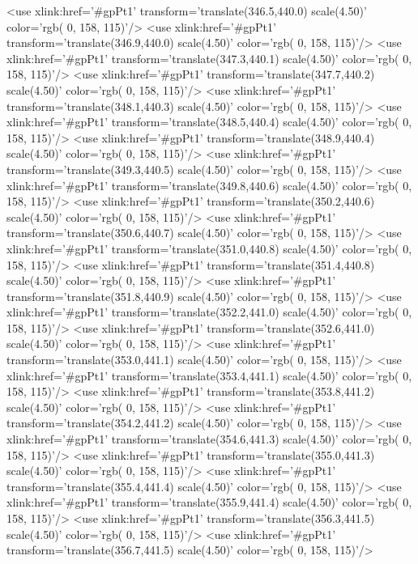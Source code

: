 	<use xlink:href='#gpPt1' transform='translate(346.5,440.0) scale(4.50)' color='rgb(  0, 158, 115)'/>
	<use xlink:href='#gpPt1' transform='translate(346.9,440.0) scale(4.50)' color='rgb(  0, 158, 115)'/>
	<use xlink:href='#gpPt1' transform='translate(347.3,440.1) scale(4.50)' color='rgb(  0, 158, 115)'/>
	<use xlink:href='#gpPt1' transform='translate(347.7,440.2) scale(4.50)' color='rgb(  0, 158, 115)'/>
	<use xlink:href='#gpPt1' transform='translate(348.1,440.3) scale(4.50)' color='rgb(  0, 158, 115)'/>
	<use xlink:href='#gpPt1' transform='translate(348.5,440.4) scale(4.50)' color='rgb(  0, 158, 115)'/>
	<use xlink:href='#gpPt1' transform='translate(348.9,440.4) scale(4.50)' color='rgb(  0, 158, 115)'/>
	<use xlink:href='#gpPt1' transform='translate(349.3,440.5) scale(4.50)' color='rgb(  0, 158, 115)'/>
	<use xlink:href='#gpPt1' transform='translate(349.8,440.6) scale(4.50)' color='rgb(  0, 158, 115)'/>
	<use xlink:href='#gpPt1' transform='translate(350.2,440.6) scale(4.50)' color='rgb(  0, 158, 115)'/>
	<use xlink:href='#gpPt1' transform='translate(350.6,440.7) scale(4.50)' color='rgb(  0, 158, 115)'/>
	<use xlink:href='#gpPt1' transform='translate(351.0,440.8) scale(4.50)' color='rgb(  0, 158, 115)'/>
	<use xlink:href='#gpPt1' transform='translate(351.4,440.8) scale(4.50)' color='rgb(  0, 158, 115)'/>
	<use xlink:href='#gpPt1' transform='translate(351.8,440.9) scale(4.50)' color='rgb(  0, 158, 115)'/>
	<use xlink:href='#gpPt1' transform='translate(352.2,441.0) scale(4.50)' color='rgb(  0, 158, 115)'/>
	<use xlink:href='#gpPt1' transform='translate(352.6,441.0) scale(4.50)' color='rgb(  0, 158, 115)'/>
	<use xlink:href='#gpPt1' transform='translate(353.0,441.1) scale(4.50)' color='rgb(  0, 158, 115)'/>
	<use xlink:href='#gpPt1' transform='translate(353.4,441.1) scale(4.50)' color='rgb(  0, 158, 115)'/>
	<use xlink:href='#gpPt1' transform='translate(353.8,441.2) scale(4.50)' color='rgb(  0, 158, 115)'/>
	<use xlink:href='#gpPt1' transform='translate(354.2,441.2) scale(4.50)' color='rgb(  0, 158, 115)'/>
	<use xlink:href='#gpPt1' transform='translate(354.6,441.3) scale(4.50)' color='rgb(  0, 158, 115)'/>
	<use xlink:href='#gpPt1' transform='translate(355.0,441.3) scale(4.50)' color='rgb(  0, 158, 115)'/>
	<use xlink:href='#gpPt1' transform='translate(355.4,441.4) scale(4.50)' color='rgb(  0, 158, 115)'/>
	<use xlink:href='#gpPt1' transform='translate(355.9,441.4) scale(4.50)' color='rgb(  0, 158, 115)'/>
	<use xlink:href='#gpPt1' transform='translate(356.3,441.5) scale(4.50)' color='rgb(  0, 158, 115)'/>
	<use xlink:href='#gpPt1' transform='translate(356.7,441.5) scale(4.50)' color='rgb(  0, 158, 115)'/>
